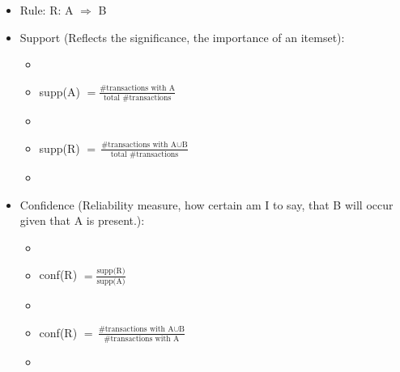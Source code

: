 \begin{breakbox}
\begin{itemize}
	\item Rule: R: A $\Rightarrow$ B
	\item Support (Reflects the significance, the importance of an itemset):
		\begin{itemize}
			\item[]
			\item[] supp(A) $= \frac{\text{\#transactions with A}}{\text{total \#transactions}}$
			\item[]
			\item[] supp(R) $= \frac{\text{\#transactions with A} \cup \text{B}}{\text{total \#transactions}}$
			\item[]
		\end{itemize}
	\item Confidence (Reliability measure, how certain am I to say, that B will occur given that A is present.):
		\begin{itemize}
			\item[]
			\item[] conf(R) $= \frac{\text{supp(R)}}{\text{supp(A)}}$
			\item[]
			\item[] conf(R) $= \frac{\text{\#transactions with A} \cup \text{B}}{\text{\#transactions with A}}$
			\item[]
		\end{itemize}
\end{itemize}
\end{breakbox}



















